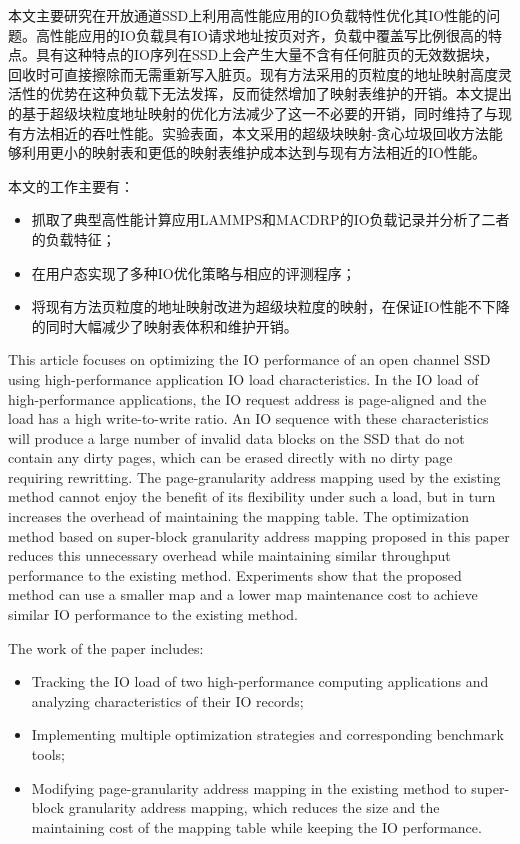 \begin{cabstract}
  本文主要研究在开放通道SSD上利用高性能应用的IO负载特性优化其IO性能的问题。高性能应用的IO负载具有IO请求地址按页对齐，负载中覆盖写比例很高的特点。具有这种特点的IO序列在SSD上会产生大量不含有任何脏页的无效数据块，回收时可直接擦除而无需重新写入脏页。现有方法采用的页粒度的地址映射高度灵活性的优势在这种负载下无法发挥，反而徒然增加了映射表维护的开销。本文提出的基于超级块粒度地址映射的优化方法减少了这一不必要的开销，同时维持了与现有方法相近的吞吐性能。实验表面，本文采用的超级块映射-贪心垃圾回收方法能够利用更小的映射表和更低的映射表维护成本达到与现有方法相近的IO性能。

  本文的工作主要有：
  \begin{itemize}
    \item 抓取了典型高性能计算应用LAMMPS和MACDRP的IO负载记录并分析了二者的负载特征；
    \item 在用户态实现了多种IO优化策略与相应的评测程序；
    \item 将现有方法页粒度的地址映射改进为超级块粒度的映射，在保证IO性能不下降的同时大幅减少了映射表体积和维护开销。
  \end{itemize}
\end{cabstract}


\begin{eabstract}
  This article focuses on optimizing the IO performance of an open channel SSD using high-performance application IO load characteristics. In the IO load of high-performance applications, the IO request address is page-aligned and the load has a high write-to-write ratio. An IO sequence with these characteristics will produce a large number of invalid data blocks on the SSD that do not contain any dirty pages, which can be erased directly with no dirty page requiring rewritting. The page-granularity address mapping used by the existing method cannot enjoy the benefit of its flexibility under such a load, but in turn increases the overhead of maintaining the mapping table. The optimization method based on super-block granularity address mapping proposed in this paper reduces this unnecessary overhead while maintaining similar throughput performance to the existing method. Experiments show that the proposed method can use a smaller map and a lower map maintenance cost to achieve similar IO performance to the existing method.

  The work of the paper includes:
  \begin{itemize}
    \item Tracking the IO load of two high-performance computing applications and analyzing characteristics of their IO records;
    \item Implementing multiple optimization strategies and corresponding benchmark tools;
    \item Modifying page-granularity address mapping in the existing method to super-block granularity address mapping, which reduces the size and the maintaining cost of the mapping table while keeping the IO performance.
  \end{itemize}
\end{eabstract}

